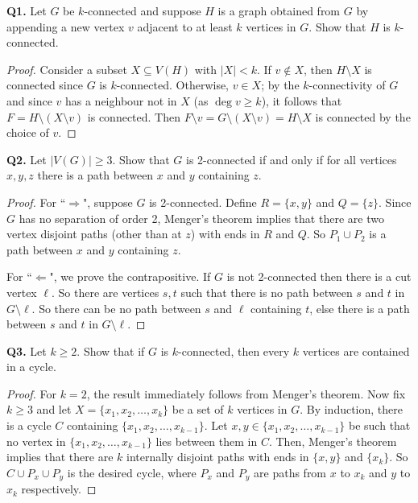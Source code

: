 \noindent \textbf{Q1.} Let $G$ be $k$-connected and suppose $H$ is a graph obtained from $G$ by appending a new vertex $v$ adjacent to at least $k$ vertices in $G$. Show that $H$ is $k$-connected.
\begin{proof}
Consider a subset $X \subseteq V(H)$ with $|X| < k$. If $v \notin X$, then $H \setminus X$ is connected since $G$ is $k$-connected. Otherwise, $v \in X$; by the $k$-connectivity of $G$ and since $v$ has a neighbour not in $X$ (as $\deg v \geq k$), it follows that $F = H \setminus (X \setminus v)$ is connected. Then $F \setminus v = G \setminus (X \setminus v) = H \setminus X $ is connected by the choice of $v$.
\end{proof}
\noindent \textbf{Q2.} Let \( |V(G)| \geq 3 \). Show that $G$ is 2-connected if and only if for all vertices $x,y,z$ there is a path between $x$ and $y$ containing $z$.
\begin{proof}
For ``$\Rightarrow$", suppose $G$ is 2-connected. Define \( R = \{ x,y \}  \) and \( Q = \{ z \}  \). Since \( G \) has no separation of order 2, Menger's theorem implies that there are two vertex disjoint paths (other than at \( z \)) with ends in \( R \) and \( Q \). So \( P_1 \cup P_2 \) is a path between \( x \) and \( y \) containing \( z \).

For ``$\Leftarrow$", we prove the contrapositive. If \( G \) is not 2-connected then there is a cut vertex \( \ell \). So there are vertices \( s,t \) such that there is no path between \( s \) and \( t \) in \( G \setminus \ell \). So there can be no path between \( s \) and \( \ell \) containing \( t \), else there is a path between \( s \) and \( t \) in \( G \setminus \ell \).
\end{proof}
\noindent \textbf{Q3.} Let \( k \geq 2 \). Show that if \( G \) is \( k \)-connected, then every \( k \) vertices are contained in a cycle.
\begin{proof}
	For \( k = 2 \), the result immediately follows from Menger's theorem. Now fix \( k \geq 3 \) and let \( X = \{ x_1, x_2, \hdots , x_{k}  \}  \) be a set of \( k \) vertices in \( G \). By induction, there is a cycle \( C \) containing \( \{ x_1, x_2, \hdots , x_{k-1}  \}  \). Let \( x, y \in \{ x_1, x_2, \hdots , x_{k-1}  \}  \) be such that no vertex in \( \{ x_1, x_2, \hdots , x_{k-1}  \}  \) lies between them in \( C \). Then, Menger's theorem implies that there are \( k \) internally disjoint paths with ends in \( \{ x, y \}  \) and \( \{ x_{k}  \}  \). So \( C \cup P_{x} \cup P_{y}   \) is  the desired cycle, where \( P_{x}  \) and \( P_{y}  \) are paths from \( x \) to \( x_{k}  \) and \( y \) to \( x_{k}  \) respectively.
\end{proof}
